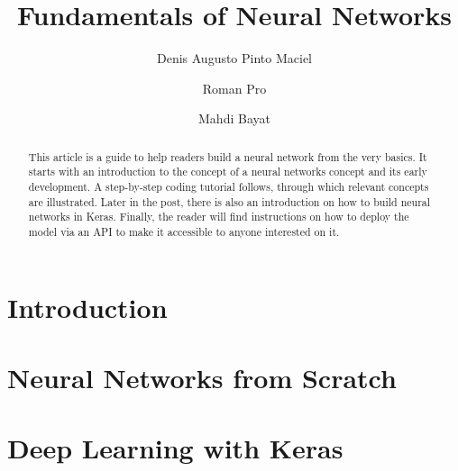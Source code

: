 \documentclass[a4paper, 11pt]{article}
\begin{document}
\title{Fundamentals of Neural Networks}

\author[1]{Denis Augusto Pinto Maciel}
\author[1]{Roman Pro}
\author[1]{Mahdi Bayat}


\maketitle

\begin{abstract}
This article is a guide to help readers build a neural network from the very basics. It starts with an introduction to the concept of a neural networks concept and its early development. A step-by-step coding tutorial follows, through which relevant concepts are illustrated. Later in the post, there is also an introduction on how to build neural networks in Keras. Finally, the reader will find instructions on how to deploy the model via an API to make it accessible to anyone interested on it.
\end{abstract}

\section{Introduction}
\label{sec:intro}


\section{Neural Networks from Scratch}
\label{sec:nn-from-scratch}


\section{Deep Learning with Keras}
\label{sec:keras}


% 

\printbibliography
\end{document}
